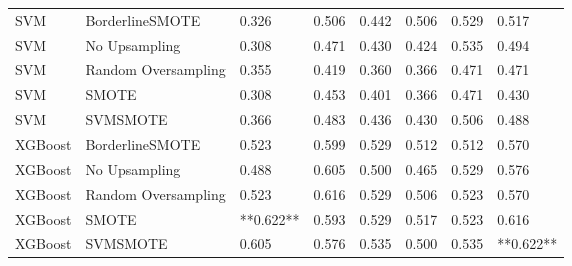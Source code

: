 \begin{tabular}{llllllll}
                         SVM &     BorderlineSMOTE &     0.326 &                     0.506 &                 0.442 &                  0.506 &                                   0.529 &     0.517 \\
                         SVM &       No Upsampling &     0.308 &                     0.471 &                 0.430 &                  0.424 &                                   0.535 &     0.494 \\
                         SVM & Random Oversampling &     0.355 &                     0.419 &                 0.360 &                  0.366 &                                   0.471 &     0.471 \\
                         SVM &               SMOTE &     0.308 &                     0.453 &                 0.401 &                  0.366 &                                   0.471 &     0.430 \\
                         SVM &            SVMSMOTE &     0.366 &                     0.483 &                 0.436 &                  0.430 &                                   0.506 &     0.488 \\
                     XGBoost &     BorderlineSMOTE &     0.523 &                     0.599 &                 0.529 &                  0.512 &                                   0.512 &     0.570 \\
                     XGBoost &       No Upsampling &     0.488 &                     0.605 &                 0.500 &                  0.465 &                                   0.529 &     0.576 \\
                     XGBoost & Random Oversampling &     0.523 &                     0.616 &                 0.529 &                  0.506 &                                   0.523 &     0.570 \\
                     XGBoost &               SMOTE & **0.622** &                     0.593 &                 0.529 &                  0.517 &                                   0.523 &     0.616 \\
                     XGBoost &            SVMSMOTE &     0.605 &                     0.576 &                 0.535 &                  0.500 &                                   0.535 & **0.622** \\
\bottomrule
\end{tabular}
